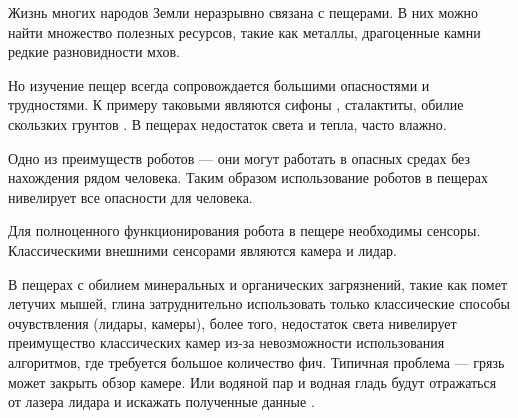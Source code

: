 
{\actuality} Жизнь многих народов Земли неразрывно связана с пещерами. В них можно найти множество полезных ресурсов, такие как металлы, драгоценные камни редкие разновидности мхов.

Но изучение пещер всегда сопровождается большими опасностями и
трудностями. К примеру таковыми являются сифоны , сталактиты, обилие скользких
грунтов . В пещерах недостаток света и тепла, часто влажно.

Одно из преимуществ роботов --- они могут работать в опасных средах без нахождения рядом человека. Таким образом использование роботов в пещерах нивелирует все опасности для человека.

Для полноценного функционирования робота в пещере необходимы сенсоры. Классическими внешними сенсорами являются камера и лидар.

В пещерах с обилием минеральных и органических загрязнений, такие как помет летучих мышей, глина затруднительно использовать только классические способы очувствления (лидары, камеры), более того, недостаток света нивелирует преимущество классических камер из-за невозможности использования алгоритмов, где требуется большое количество фич. Типичная проблема --- грязь  может закрыть обзор камере. Или водяной пар и водная гладь  будут отражаться от лазера лидара и искажать полученные данные .

